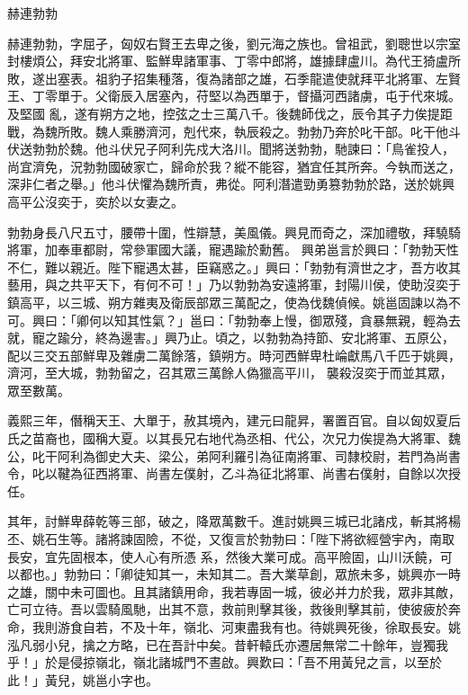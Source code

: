 
\begin{pinyinscope}

 赫連勃勃



 赫連勃勃，字屈孑，匈奴右賢王去卑之後，劉元海之族也。曾祖武，劉聰世以宗室封樓煩公，拜安北將軍、監鮮卑諸軍事、丁零中郎將，雄據肆盧川。為代王猗盧所敗，遂出塞表。祖豹子招集種落，復為諸部之雄，石季龍遣使就拜平北將軍、左賢王、丁零單于。父衛辰入居塞內，苻堅以為西單于，督攝河西諸虜，屯于代來城。及堅國
 亂，遂有朔方之地，控弦之士三萬八千。後魏師伐之，辰令其子力俟提距戰，為魏所敗。魏人乘勝濟河，剋代來，執辰殺之。勃勃乃奔於叱干部。叱干他斗伏送勃勃於魏。他斗伏兄子阿利先戍大洛川。聞將送勃勃，馳諫曰：「鳥雀投人，尚宜濟免，況勃勃國破家亡，歸命於我？縱不能容，猶宜任其所奔。今執而送之，深非仁者之舉。」他斗伏懼為魏所責，弗從。阿利潛遣勁勇篡勃勃於路，送於姚興高平公沒奕于，奕於以女妻之。



 勃勃身長八尺五寸，腰帶十圍，性辯慧，美風儀。興見而奇之，深加禮敬，拜驍騎將軍，加奉車都尉，常參軍國大議，寵遇踰於勳舊。
 興弟邕言於興曰：「勃勃天性不仁，難以親近。陛下寵遇太甚，臣竊惑之。」興曰：「勃勃有濟世之才，吾方收其藝用，與之共平天下，有何不可！」乃以勃勃為安遠將軍，封陽川侯，使助沒奕于鎮高平，以三城、朔方雜夷及衛辰部眾三萬配之，使為伐魏偵候。姚邕固諫以為不可。興曰：「卿何以知其性氣？」邕曰：「勃勃奉上慢，御眾殘，貪暴無親，輕為去就，寵之踰分，終為邊害。」興乃止。頃之，以勃勃為持節、安北將軍、五原公，配以三交五部鮮卑及雜虜二萬餘落，鎮朔方。時河西鮮卑杜崘獻馬八千匹于姚興，濟河，至大城，勃勃留之，召其眾三萬餘人偽獵高平川，
 襲殺沒奕于而並其眾，眾至數萬。



 義熙三年，僭稱天王、大單于，赦其境內，建元曰龍昇，署置百官。自以匈奴夏后氏之苗裔也，國稱大夏。以其長兄右地代為丞相、代公，次兄力俟提為大將軍、魏公，叱干阿利為御史大夫、梁公，弟阿利羅引為征南將軍、司隸校尉，若門為尚書令，叱以鞬為征西將軍、尚書左僕射，乙斗為征北將軍、尚書右僕射，自餘以次授任。



 其年，討鮮卑薛乾等三部，破之，降眾萬數千。進討姚興三城已北諸戍，斬其將楊丕、姚石生等。諸將諫固險，不從，又復言於勃勃曰：「陛下將欲經營宇內，南取長安，宜先固根本，使人心有所憑
 系，然後大業可成。高平險固，山川沃饒，可以都也。」勃勃曰：「卿徒知其一，未知其二。吾大業草創，眾旅未多，姚興亦一時之雄，關中未可圖也。且其諸鎮用命，我若專固一城，彼必并力於我，眾非其敵，亡可立待。吾以雲騎風馳，出其不意，救前則擊其後，救後則擊其前，使彼疲於奔命，我則游食自若，不及十年，嶺北、河東盡我有也。待姚興死後，徐取長安。姚泓凡弱小兒，擒之方略，已在吾計中矣。昔軒轅氏亦遷居無常二十餘年，豈獨我乎！」於是侵掠嶺北，嶺北諸城門不晝啟。興歎曰：「吾不用黃兒之言，以至於此！」黃兒，姚邕小字也。




\end{pinyinscope}
